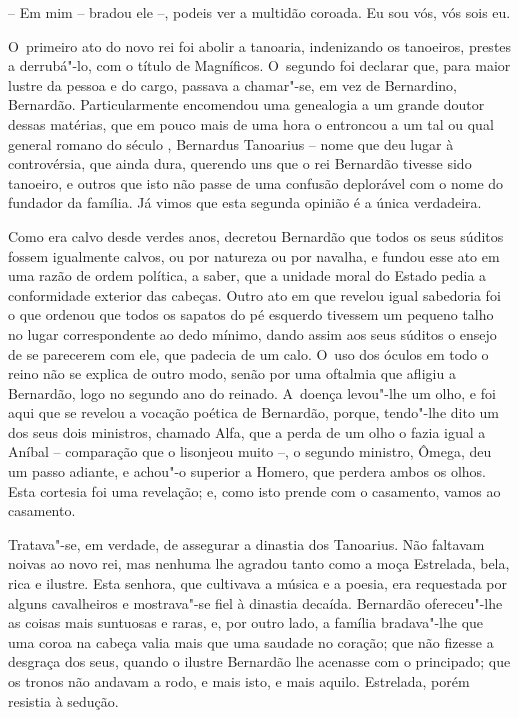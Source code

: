 -- Em mim -- bradou ele --, podeis ver a multidão coroada. Eu sou vós,
vós sois eu.

O~primeiro ato do novo rei foi abolir a tanoaria, indenizando os
tanoeiros, prestes a derrubá"-lo, com o título de Magníficos. O~segundo
foi declarar que, para maior lustre da pessoa e do cargo, passava a
chamar"-se, em vez de Bernardino, Bernardão. Particularmente encomendou
uma genealogia a um grande doutor dessas matérias, que em pouco mais de
uma hora o entroncou a um tal ou qual general romano do século ,
Bernardus Tanoarius -- nome que deu lugar à controvérsia, que ainda
dura, querendo uns que o rei Bernardão tivesse sido tanoeiro, e outros
que isto não passe de uma confusão deplorável com o nome do fundador da
família. Já vimos que esta segunda opinião é a única verdadeira.

Como era calvo desde verdes anos, decretou Bernardão que todos os seus
súditos fossem igualmente calvos, ou por natureza ou por navalha, e
fundou esse ato em uma razão de ordem política, a saber, que a unidade
moral do Estado pedia a conformidade exterior das cabeças. Outro ato em
que revelou igual sabedoria foi o que ordenou que todos os sapatos do pé
esquerdo tivessem um pequeno talho no lugar correspondente ao dedo
mínimo, dando assim aos seus súditos o ensejo de se parecerem com ele,
que padecia de um calo. O~uso dos óculos em todo o reino não se explica
de outro modo, senão por uma oftalmia que afligiu a Bernardão, logo no
segundo ano do reinado. A~doença levou"-lhe um olho, e foi aqui que se
revelou a vocação poética de Bernardão, porque, tendo"-lhe dito um dos
seus dois ministros, chamado Alfa, que a perda de um olho o fazia igual
a Aníbal -- comparação que o lisonjeou muito --, o segundo ministro,
Ômega, deu um passo adiante, e achou"-o superior a Homero, que perdera
ambos os olhos. Esta cortesia foi uma revelação; e, como isto prende com
o casamento, vamos ao casamento.

Tratava"-se, em verdade, de assegurar a dinastia dos Tanoarius. Não
faltavam noivas ao novo rei, mas nenhuma lhe agradou tanto como a moça
Estrelada, bela, rica e ilustre. Esta senhora, que cultivava a música e
a poesia, era requestada por alguns cavalheiros e mostrava"-se fiel à
dinastia decaída. Bernardão ofereceu"-lhe as coisas mais suntuosas e
raras, e, por outro lado, a família bradava"-lhe que uma coroa na cabeça
valia mais que uma saudade no coração; que não fizesse a desgraça dos
seus, quando o ilustre Bernardão lhe acenasse com o principado; que os
tronos não andavam a rodo, e mais isto, e mais aquilo. Estrelada, porém
resistia à sedução.

